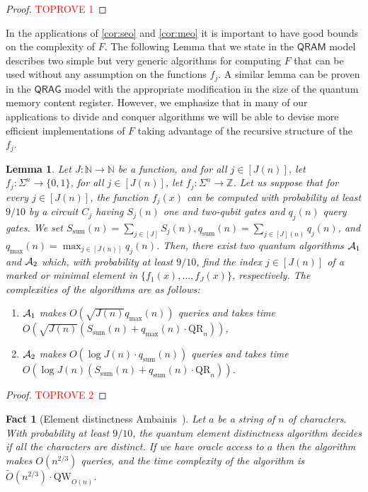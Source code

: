 \documentclass[12pt]{article}
\newcommand{\qr}{\mathrm{QR}}
\newcommand{\qw}{\mathrm{QW}}
\newcommand{\su}{\mathrm{sum}}
\newcommand{\N}{\mathbb{N}}
\newcommand{\Z}{\mathbb{Z}}
\newtheorem{lemma}[theorem]{Lemma}
\newtheorem{fact}[theorem]{Fact}
\theoremstyle{definition}
\begin{document}
\begin{proof}\textcolor{red}{TOPROVE 1}\end{proof}

In the applications of \cref{cor:seo} and \cref{cor:meo} it is important to have good bounds on the complexity of $F$. The following Lemma that we state in the $\mathsf{QRAM}$ model describes two simple but very generic algorithms for computing $F$ that can be used without any assumption on the functions $f_j$. 
A similar lemma can be proven in the $\mathsf{QRAG}$ model with the appropriate modification in the size of the quantum memory content register.
However, we emphasize that in many of our applications to divide and conquer algorithms we will be able to devise more efficient implementations of $F$ taking advantage of the recursive structure of the $f_j$.

\begin{lemma}
\label{lem:two}
Let $J : \N \rightarrow \N$ be a function, and for all $j \in [J(n)]$, let $f_j : \Sigma^n \rightarrow \{0,1\}$, for all $j \in [J(n)]$, let $f_j : \Sigma^n \rightarrow \Z$.
Let us suppose that for every $j \in [J(n)]$, the function $f_j(x)$ can be computed with probability at least $9/10$ by a circuit $C_j$ having $S_j(n)$ one and two-qubit gates and $q_j(n)$ query gates.  
We set $S_{\su}(n) = \sum_{j \in [J]} S_j(n), q_{\su}(n) = \sum_{j \in [J](n)} q_j(n)$, and $q_{\max}(n) = \max_{j \in [J(n)]} q_j(n)$.
Then, there exist two quantum algorithms ${\cal A}_1$ and  ${\cal A}_2$ which, with probability at least $9/10$, find the index $j \in [J(n)]$ of a marked or minimal element in $\{f_1(x), \ldots , f_J(x)\}$, respectively.  The complexities of the algorithms are as follows:
\begin{enumerate}
\item
${\cal A}_1$ makes $O(\sqrt{J(n)} q_{\max}(n)  )$ queries and takes time $O(\sqrt{J(n)} (S_{\su}(n) +q_{\max}(n) \cdot \qr_n))$,
\item
${\cal A}_2$ makes $O(\log J(n)  \cdot q_{\su}(n)  )$ queries and takes time $O(\log{J(n)} (S_{\su}(n) +  q_{\su}(n) \cdot \qr_n))$.
\end{enumerate}
\end{lemma}

\begin{proof}\textcolor{red}{TOPROVE 2}\end{proof}

\begin{fact}[{\sc Element distinctness} Ambainis~\cite{Amb07}]
\label{fact:ed}
Let $a$ be a string of $n$ of characters. 
With probability at least $9/10$,  the quantum element distinctness algorithm decides if all the characters are distinct.
If we have oracle access to $a$ then the algorithm makes ${O}(n^{2/3} )$ queries, and the time complexity of the algorithm is~$\widetilde{O}(n^{2/3}) \cdot \qw_{O(n)}$.
\end{fact}
\end{document}
